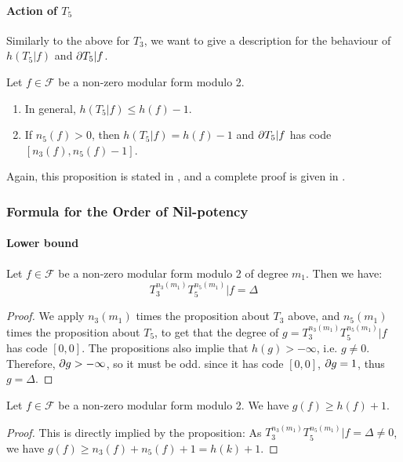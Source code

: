 \paragraph{Action of $T_5$}
Similarly to the above for $T_3$, we want to give a description for the behaviour of $h(T_5|f)$ and $\partial T_5|f$.
\begin{proposition}
	Let $f \in \mathcal{F}$ be a non-zero modular form modulo 2.
	\begin{enumerate}
		\item In general, $h(T_5|f) \leq h(f)-1$.
		\item If $n_5(f)>0$, then $h(T_5|f) = h(f)-1$ and $\partial T_5|f$ has code $\left[ n_3(f), n_5(f)-1 \right] $.
	\end{enumerate}
\end{proposition}
Again, this proposition is stated in \cite[§4]{OrdreNilpotenceOperateurHecke}, and a complete proof is given in \cite{ModularFormsMcGill}.



\subsubsection{Formula for the Order of Nil-potency}
\paragraph{Lower bound}
\begin{property}
	Let $f \in \mathcal{F}$ be a non-zero modular form modulo 2 of degree $m_1$.
	Then we have:
	$$
	T_3^{n_3(m_1)} T_5^{n_5(m_1)} | f = \Delta
	$$
\end{property}
\begin{proof}
	We apply $n_3(m_1)$ times the proposition about $T_3$ above, and $n_5(m_1)$ times the proposition about $T_5$, to get that the degree of $g = T_3^{n_3(m_1)}T_5^{n_5(m_1)}|f$ has code $\left[ 0,0 \right]$.
	The propositions also implie that $h(g) > -\infty$, i.e. $g \neq 0$.
	Therefore, $\partial g > -\infty$, so it must be odd. since it has code $\left[ 0,0 \right]$,  $\partial g = 1$, thus $g = \Delta$.
\end{proof}

\begin{corollary}
	Let $f \in \mathcal{F}$ be a non-zero modular form modulo 2.
	We have $g(f) \geq h(f) +1$.
\end{corollary}
\begin{proof}
	This is directly implied by the proposition:
	As $T_3^{n_3(m_1)}T_5^{n_5(m_1)}|f = \Delta \neq 0$, we have $g(f) \geq n_3(f)+n_5(f)+1 = h(k)+1$.
\end{proof}

